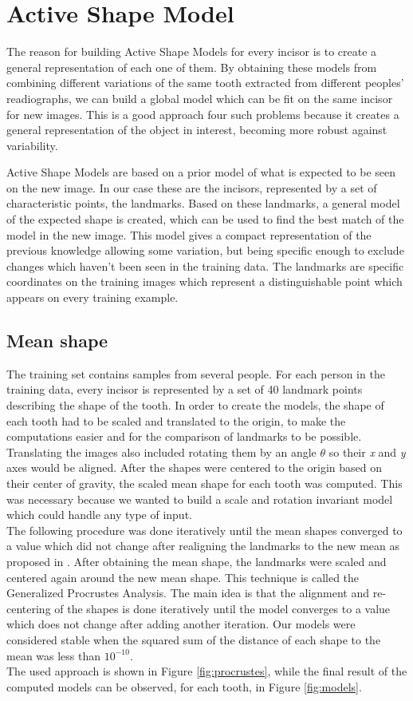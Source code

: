 \documentclass[a4paper]{article}
\begin{document}
\section{Active Shape Model}\label{sec:modelling}
The reason for building Active Shape Models for every incisor is to create a general representation of each one of them. By obtaining these models from combining different variations of the same tooth extracted from different peoples' readiographs, we can build a global model which can be fit on the same incisor for new images. This is a good approach four such problems because it creates a general representation of the object in interest, becoming more robust against variability.

Active Shape Models are based on a prior model of what is expected to be seen on the new image. In our case these are the incisors, represented by a set of characteristic points, the landmarks. Based on these landmarks, a general model of the expected shape is created, which can be used to find the best match of the model in the new image. This model gives a compact representation of the previous knowledge allowing some variation, but being specific enough to exclude changes which haven't been seen in the training data. The landmarks are specific coordinates on the training images which represent a distinguishable point which appears on every training example.

\subsection{Mean shape} 
The training set contains samples from several people. For each person in the training data, every incisor is represented by a set of 40 landmark points describing the shape of the tooth. In order to create the models, the shape of each tooth had to be scaled and translated to the origin, to make the computations easier and for the comparison of landmarks to be possible. Translating the images also included rotating them by an angle $\theta$ so their \textit{x} and \textit{y} axes would be aligned. After the shapes were centered to the origin based on their center of gravity, the scaled mean shape for each tooth was computed. This was necessary because we wanted to build a scale and rotation invariant model which could handle any type of input. \\ 
The following procedure was done iteratively until the mean shapes converged to a value which did not change after realigning the landmarks to the new mean as proposed in \cite{cootes2}. After obtaining the mean shape, the landmarks were scaled and centered again around the new mean shape. This technique is called the Generalized Procrustes Analysis. The main idea is that the alignment and re-centering of the shapes is done iteratively until the model converges to a value which does not change after adding another iteration. Our models were considered stable when the squared sum of the distance of each shape to the mean was less than $10^{-10}$.\\ The used approach is shown in Figure \ref{fig:procrustes}, while the final result of the computed models can be observed, for each tooth, in Figure \ref{fig:models}.
\end{document}
